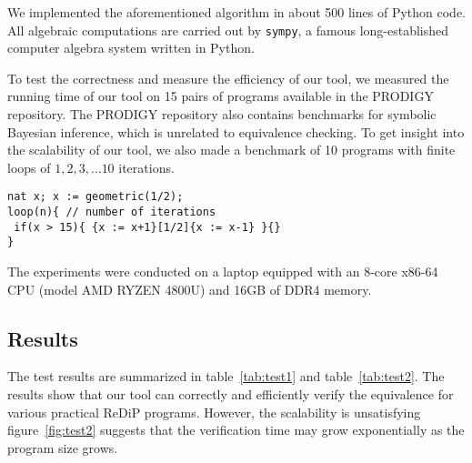 \documentclass[a4paper]{article}
\begin{document}
We implemented the aforementioned algorithm in about 500 lines of Python code. All algebraic computations are carried out by \texttt{sympy}\cite{sympy}, a famous long-established computer algebra system written in Python.\par
To test the correctness and measure the efficiency of our tool, we measured the running time of our tool on 15 pairs of programs available in the PRODIGY repository. The PRODIGY repository also contains benchmarks for symbolic Bayesian inference, which is unrelated to equivalence checking. To get insight into the scalability of our tool, we also made a benchmark of 10 programs with finite loops of \(1,2,3,\ldots 10\) iterations.
\begin{verbatim}
nat x; x := geometric(1/2);
loop(n){ // number of iterations
 if(x > 15){ {x := x+1}[1/2]{x := x-1} }{}
}
\end{verbatim}
The experiments were conducted on a laptop equipped with an 8-core x86-64 CPU (model AMD RYZEN 4800U) and 16GB of DDR4 memory.

\subsection{Results}

The test results are summarized in table~\ref{tab:test1} and table~\ref{tab:test2}.
The results show that our tool can correctly and efficiently verify the equivalence for various practical ReDiP programs.
However, the scalability is unsatisfying figure~\ref{fig:test2} suggests that the verification time may grow exponentially as the program size grows.
\end{document}
